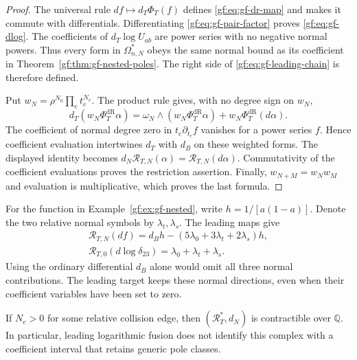 \begin{proof}
The universal rule \(df\mapsto d_T\Phi_T(f)\) defines
\eqref{gf:eq:gf-dr-map} and makes it commute with differentials.
Differentiating \eqref{gf:eq:gf-pair-factor} proves
\eqref{gf:eq:gf-dlog}.  The coefficients of \(d_T\log U_{ab}\)
are power series with no negative normal powers.
Thus every form in \(\Omega^*_{n,N}\) obeys the same normal
bound as its coefficient in Theorem~\ref{gf:thm:gf-nested-poles}.
The right side of \eqref{gf:eq:gf-leading-chain} is therefore defined.

Put \(w_N=\rho^{N_0}\prod_et_e^{N_e}\).
The product rule gives, with no degree sign on \(w_N\),
\[
 d_T(w_N\Phi_T^{\mathrm{dR}}\alpha)
  =\omega_N\wedge(w_N\Phi_T^{\mathrm{dR}}\alpha)
       +w_N\Phi_T^{\mathrm{dR}}(d\alpha).
\]
The coefficient of normal degree zero in \(t_e\partial_{t_e}f\)
vanishes for a power series \(f\).
Hence coefficient evaluation intertwines \(d_T\) with \(d_B\)
on these weighted forms.  The displayed identity becomes
\(d_N\mathcal R_{T,N}(\alpha)=\mathcal R_{T,N}(d\alpha)\).
Commutativity of the coefficient evaluations proves the restriction
assertion.  Finally, \(w_{N+M}=w_Nw_M\) and evaluation is
multiplicative, which proves the last formula.
\end{proof}

For the function in Example~\ref{gf:ex:gf-nested}, write
\(h=1/[a(1-a)]\).  Denote the two relative normal symbols by
\(\lambda_t,\lambda_s\).  The leading maps give
\begin{gather*}
 \mathcal R_{T,N}(df)=d_Bh-(5\lambda_0+3\lambda_t+2\lambda_s)h,\\
 \mathcal R_{T,0}(d\log\delta_{23})=\lambda_0+\lambda_t+\lambda_s.
\end{gather*}
Using the ordinary differential \(d_B\) alone would omit all
three normal contributions.
The leading target keeps these normal directions, even when their
coefficient variables have been set to zero.

\begin{proposition}\label{gf:prop:gf-normal-mode}
If \(N_e>0\) for some relative collision edge, then
\((\mathscr R_T^*,d_N)\) is contractible over \(\mathbb Q\).
In particular, leading logarithmic fusion does not identify this
complex with a coefficient interval that retains generic pole classes.
\end{proposition}

